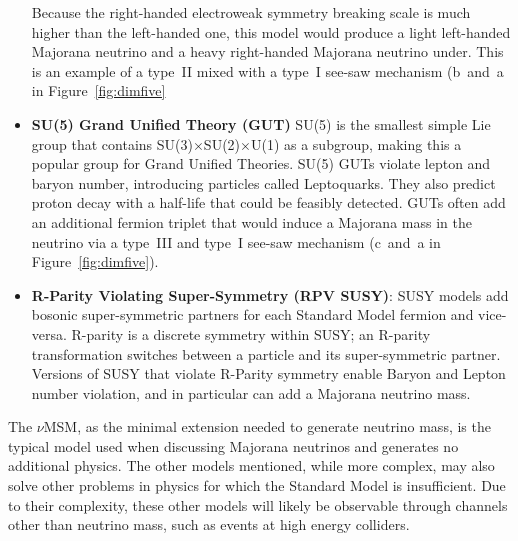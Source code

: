 \documentclass[/main.tex]{subfiles}
\begin{document}
\begin{itemize}
  Because the right-handed electroweak symmetry breaking scale is much higher than the left-handed one, this model would produce a light left-handed Majorana neutrino and a heavy right-handed Majorana neutrino under.
  This is an example of a type~II mixed with a type~I see-saw mechanism (b~and~a in Figure~\ref{fig:dimfive}
\item \textbf{SU(5) Grand Unified Theory (GUT)} SU(5) is the smallest simple Lie group that contains SU(3)$\times$SU(2)$\times$U(1) as a subgroup, making this a popular group for Grand Unified Theories.
  SU(5) GUTs violate lepton and baryon number, introducing particles called Leptoquarks.
  They also predict proton decay with a half-life that could be feasibly detected.
  GUTs often add an additional fermion triplet that would induce a Majorana mass in the neutrino via a type~III and type~I see-saw mechanism (c~and~a in Figure~\ref{fig:dimfive}).
\item \textbf{R-Parity Violating Super-Symmetry (RPV SUSY)}: SUSY models add bosonic super-symmetric partners for each Standard Model fermion and vice-versa.
  R-parity is a discrete symmetry within SUSY; an R-parity transformation switches between a particle and its super-symmetric partner.
  Versions of SUSY that violate R-Parity symmetry enable Baryon and Lepton number violation, and in particular can add a Majorana neutrino mass.
\end{itemize}
The $\nu$MSM, as the minimal extension needed to generate neutrino mass, is the typical model used when discussing Majorana neutrinos and generates no additional physics.
The other models mentioned, while more complex, may also solve other problems in physics for which the Standard Model is insufficient.
Due to their complexity, these other models will likely be observable through channels other than neutrino mass, such as events at high energy colliders.
\end{document}
